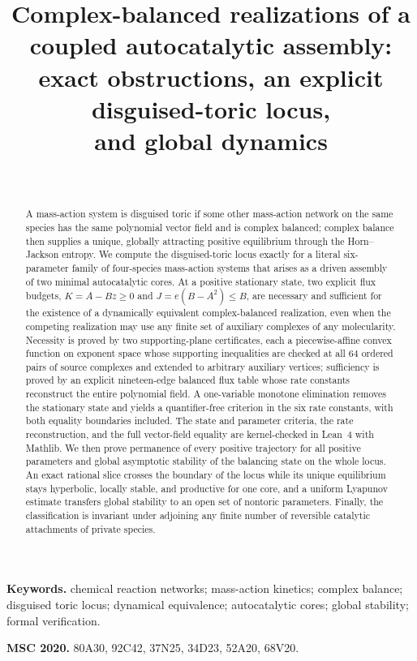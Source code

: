 \documentclass[11pt,a4paper]{article}
\title{Complex-balanced realizations of a coupled autocatalytic assembly:\\ exact obstructions, an explicit disguised-toric locus,\\ and global dynamics}
\author{\PaperAuthor\\ \PaperAffiliation}
\date{\PaperDate}
\theoremstyle{plain}
\theoremstyle{definition}
\theoremstyle{remark}
\begin{document}
\maketitle

\begin{abstract}
A mass-action system is disguised toric if some other mass-action network on the same species has the same polynomial vector field and is complex balanced; complex balance then supplies a unique, globally attracting positive equilibrium through the Horn--Jackson entropy. We compute the disguised-toric locus exactly for a literal six-parameter family of four-species mass-action systems that arises as a driven assembly of two minimal autocatalytic cores. At a positive stationary state, two explicit flux budgets, $K=A-Bz\ge0$ and $J=e(B-A^2)\le B$, are necessary and sufficient for the existence of a dynamically equivalent complex-balanced realization, even when the competing realization may use any finite set of auxiliary complexes of any molecularity. Necessity is proved by two supporting-plane certificates, each a piecewise-affine convex function on exponent space whose supporting inequalities are checked at all $64$ ordered pairs of source complexes and extended to arbitrary auxiliary vertices; sufficiency is proved by an explicit nineteen-edge balanced flux table whose rate constants reconstruct the entire polynomial field. A one-variable monotone elimination removes the stationary state and yields a quantifier-free criterion in the six rate constants, with both equality boundaries included. The state and parameter criteria, the rate reconstruction, and the full vector-field equality are kernel-checked in Lean~4 with Mathlib. We then prove permanence of every positive trajectory for all positive parameters and global asymptotic stability of the balancing state on the whole locus. An exact rational slice crosses the boundary of the locus while its unique equilibrium stays hyperbolic, locally stable, and productive for one core, and a uniform Lyapunov estimate transfers global stability to an open set of nontoric parameters. Finally, the classification is invariant under adjoining any finite number of reversible catalytic attachments of private species.
\end{abstract}

\noindent\textbf{Keywords.} chemical reaction networks; mass-action kinetics; complex balance; disguised toric locus; dynamical equivalence; autocatalytic cores; global stability; formal verification.

\medskip
\noindent\textbf{MSC 2020.} 80A30, 92C42, 37N25, 34D23, 52A20, 68V20.
\end{document}
